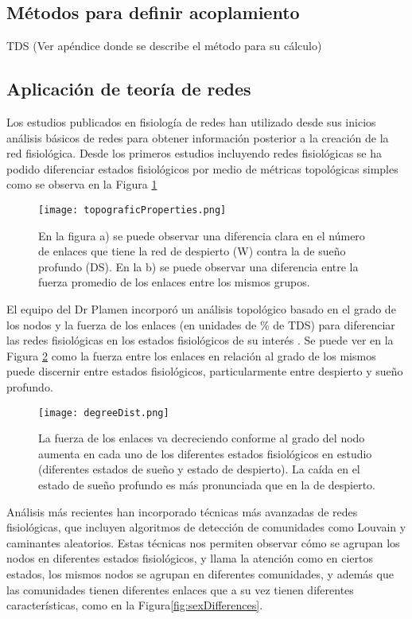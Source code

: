\documentclass[twoside,twocolumn]{article}
\begin{document}
\subsection{Métodos para definir acoplamiento}
TDS (Ver apéndice donde se describe el método para su cálculo)


\subsection{Aplicación de teoría de redes}
Los estudios publicados en fisiología de redes han utilizado desde sus inicios análisis básicos de redes para obtener información posterior a la creación de la red fisiológica.
Desde los primeros estudios incluyendo redes fisiológicas se ha podido diferenciar estados fisiológicos por medio de métricas topológicas simples como se observa en la Figura \ref{fig:topograficProperties}

\begin{figure}[H]
  \texttt{[image: topograficProperties.png]}
  \caption{En la figura a) se puede observar una diferencia clara en el número de enlaces que tiene la red de despierto (W) contra la de sueño profundo (DS). En la b) se puede observar una diferencia entre la fuerza promedio de los enlaces entre los mismos grupos.}
  \label{fig:topograficProperties}
\end{figure}

El equipo del Dr Plamen incorporó un análisis topológico basado en el grado de los nodos y la fuerza de los enlaces (en unidades de \% de TDS) para diferenciar las redes fisiológicas en los estados fisiológicos de su interés \cite{bashan2012network}\cite{2015Plasticity}.
Se puede ver en la Figura \ref{fig:degreeDist} como la fuerza entre los enlaces en relación al grado de los mismos puede discernir entre estados fisiológicos, particularmente entre despierto y sueño profundo.

\begin{figure}[H]
  \texttt{[image: degreeDist.png]}
  \caption{La fuerza de los enlaces va decreciendo conforme al grado del nodo aumenta en cada uno de los diferentes estados fisiológicos en estudio (diferentes estados de sueño y estado de despierto). La caída en el estado de sueño profundo es más pronunciada que en la de despierto.}
  \label{fig:degreeDist}
\end{figure}

Análisis más recientes han incorporado técnicas más avanzadas de redes fisiológicas, que incluyen algoritmos de detección de comunidades como Louvain y caminantes aleatorios\cite{barajas2021sex}\cite{barajas2021physiological}\cite{barajas2020metabolic}\cite{chmiel2014spreading}.
Estas técnicas nos permiten observar cómo se agrupan los nodos en diferentes estados fisiológicos, y llama la atención como en ciertos estados, los mismos nodos se agrupan en diferentes comunidades, y además que las comunidades tienen diferentes enlaces que a su vez tienen diferentes características, como en la Figura\ref{fig:sexDifferences}.
\end{document}
